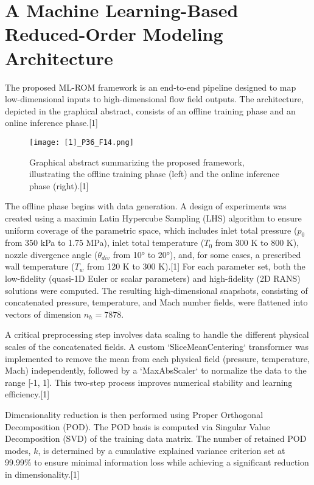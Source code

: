 \documentclass[12pt, a4paper]{report}
\begin{document}
\section{A Machine Learning-Based Reduced-Order Modeling Architecture}

The proposed ML-ROM framework is an end-to-end pipeline designed to map low-dimensional inputs to high-dimensional flow field outputs. The architecture, depicted in the graphical abstract, consists of an offline training phase and an online inference phase.[1]

\begin{figure}[h!]
    \centering
    \texttt{[image: [1]\_P36\_F14.png]}
    \caption{Graphical abstract summarizing the proposed framework, illustrating the offline training phase (left) and the online inference phase (right).[1]}
    \label{fig:graphical_abstract}
\end{figure}

The offline phase begins with data generation. A design of experiments was created using a maximin Latin Hypercube Sampling (LHS) algorithm to ensure uniform coverage of the parametric space, which includes inlet total pressure ($p_0$ from 350 kPa to 1.75 MPa), inlet total temperature ($T_0$ from 300 K to 800 K), nozzle divergence angle ($\theta_{div}$ from \ang{10} to \ang{20}), and, for some cases, a prescribed wall temperature ($T_w$ from 120 K to 300 K).[1] For each parameter set, both the low-fidelity (quasi-1D Euler or scalar parameters) and high-fidelity (2D RANS) solutions were computed. The resulting high-dimensional snapshots, consisting of concatenated pressure, temperature, and Mach number fields, were flattened into vectors of dimension $n_h = 7878$.

A critical preprocessing step involves data scaling to handle the different physical scales of the concatenated fields. A custom `SliceMeanCentering` transformer was implemented to remove the mean from each physical field (pressure, temperature, Mach) independently, followed by a `MaxAbsScaler` to normalize the data to the range [-1, 1]. This two-step process improves numerical stability and learning efficiency.[1]

Dimensionality reduction is then performed using Proper Orthogonal Decomposition (POD). The POD basis is computed via Singular Value Decomposition (SVD) of the training data matrix. The number of retained POD modes, $k$, is determined by a cumulative explained variance criterion set at 99.99\% to ensure minimal information loss while achieving a significant reduction in dimensionality.[1]
\end{document}
